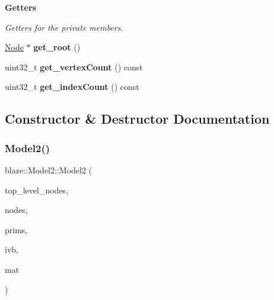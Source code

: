 \begin{Indent}\textbf{ Getters}\par
{\em Getters for the private members. }\begin{DoxyCompactItemize}
\item 
\mbox{\label{classblaze_1_1Model2_aa1a25c9afa425bbab29f21f62406f4ee}} 
\hyperlink{structblaze_1_1Node}{Node} $\ast$ {\bfseries get\+\_\+root} ()
\item 
\mbox{\label{classblaze_1_1Model2_ac155ee39c93a29eb812eb34c08f0843a}} 
uint32\+\_\+t {\bfseries get\+\_\+vertex\+Count} () const
\item 
\mbox{\label{classblaze_1_1Model2_a2de1c54d15f890a6054699aafc18dba6}} 
uint32\+\_\+t {\bfseries get\+\_\+index\+Count} () const
\end{DoxyCompactItemize}
\end{Indent}


\subsection{Constructor \& Destructor Documentation}
\mbox{\label{classblaze_1_1Model2_a1417c8c21b0003a068e20405f3b8e22c}} 
\subsubsection{\texorpdfstring{Model2()}{Model2()}}
{\footnotesize\ttfamily blaze\+::\+Model2\+::\+Model2 (\begin{DoxyParamCaption}\item[{const std\+::vector$<$ int $>$ \&}]{top\+\_\+level\+\_\+nodes,  }\item[{std\+::vector$<$ \hyperlink{structblaze_1_1Node}{Node} $>$ \&\&}]{nodes,  }\item[{std\+::vector$<$ \hyperlink{structblaze_1_1Primitive}{Primitive} $>$ \&\&}]{prims,  }\item[{\hyperlink{classblaze_1_1IndexedVertexBuffer}{Indexed\+Vertex\+Buffer}$<$ \hyperlink{structblaze_1_1Vertex}{Vertex} $>$ \&\&}]{ivb,  }\item[{\hyperlink{structblaze_1_1Model2_1_1Material}{Material} \&\&}]{mat }\end{DoxyParamCaption})\hspace{0.3cm}{\ttfamily [noexcept]}}



